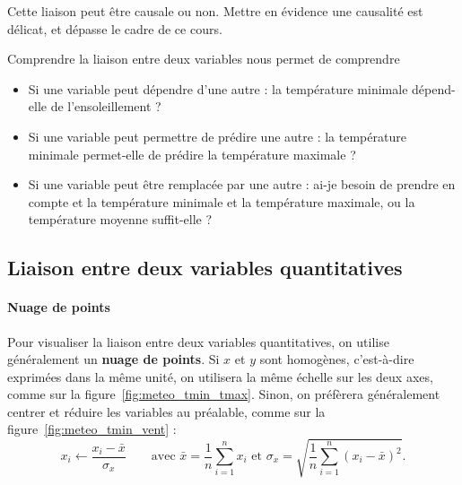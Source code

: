 Cette liaison peut être causale ou non. Mettre en évidence une causalité est
délicat, et dépasse le cadre de ce cours.

Comprendre la liaison entre deux variables nous permet de comprendre 
\begin{itemize}
\item Si une variable peut dépendre d'une autre : la température minimale
  dépend-elle de l'ensoleillement ?
\item Si une variable peut permettre de prédire une autre : la température
  minimale permet-elle de prédire la température maximale ?
\item Si une variable peut être remplacée par une autre : ai-je besoin de
  prendre en compte et la température minimale et la température maximale, ou
  la température moyenne suffit-elle ?
\end{itemize}

\subsection{Liaison entre deux variables quantitatives}

\paragraph{Nuage de points}
Pour visualiser la liaison entre deux variables quantitatives, on utilise
généralement un \textbf{nuage de points}. Si $x$ et $y$ sont homogènes,
c'est-à-dire exprimées dans la même unité, on utilisera la même échelle sur les
deux axes, comme sur la figure~\ref{fig:meteo_tmin_tmax}. Sinon, on préfèrera
généralement centrer et réduire les variables au préalable, comme sur la
figure~\ref{fig:meteo_tmin_vent} : 
\[
  x_i \leftarrow \frac{x_i - \bar x}{\sigma_x} \qquad \text{avec } \bar x = \frac{1}{n} \sum_{i=1}^n x_i 
  \text{ et } \sigma_x = \sqrt{\frac{1}{n} \sum_{i=1}^n(x_i - \bar x)^2}.
\]

